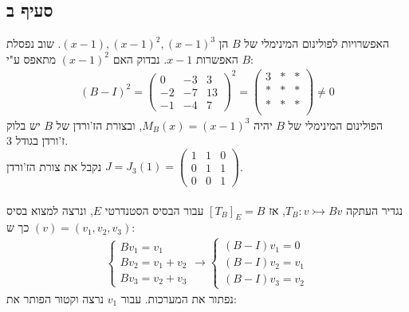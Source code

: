\documentclass{article}
\begin{document}
\subsection*{סעיף ב}
האפשרויות לפולינום המינימלי של $B$ הן $(x-1), (x-1)^2, (x-1)^3$. שוב נפסלת האפשרות $x-1$. נבדוק האם $(x-1)^2$ מתאפס ע"י $B$:
\begin{align*}
    (B-I)^2=\begin{pmatrix}
                0  & -3 & 3  \\
                -2 & -7 & 13 \\
                -1 & -4 & 7
            \end{pmatrix}^2=\begin{pmatrix}
                                3    & \ast & \ast \\
                                \ast & \ast & \ast \\
                                \ast & \ast & \ast \\
                            \end{pmatrix}\ne 0
\end{align*}
הפולינום המינימלי של $B$ יהיה $M_B(x)=(x-1)^3$, ובצורת הז'ורדן של $B$ יש בלוק ז'ורדן בגודל 3. \\
נקבל את צורת הז'ורדן $J=J_3(1)=\begin{pmatrix}
        1 & 1 & 0 \\
        0 & 1 & 1 \\
        0 & 0 & 1
    \end{pmatrix}$. \\\\
נגדיר העתקה $T_B: v \rightarrowtail Bv$, אז $[T_B]_E=B$ עבור הבסיס הסטנדרטי $E$, ונרצה למצוא בסיס $(v)=(v_1, v_2, v_3)$ כך ש:
\begin{align*}
    \begin{cases}
        Bv_1=v_1     \\
        Bv_2=v_1+v_2 \\
        Bv_3=v_2+v_3
    \end{cases} \rightarrow
    \begin{cases}
        (B-I)v_1=0   \\
        (B-I)v_2=v_1 \\
        (B-I)v_3=v_2
    \end{cases}
\end{align*}
נפתור את המערכות. עבור $v_1$ נרצה וקטור הפותר את:
\end{document}
